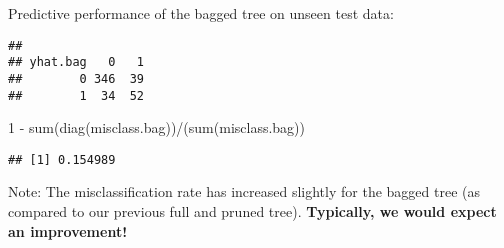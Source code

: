 \documentclass[
  10pt,
  ignorenonframetext,
]{beamer}
\newenvironment{Shaded}{\begin{snugshade}}{\end{snugshade}}
\newcommand{\AttributeTok}[1]{\textcolor[rgb]{0.77,0.63,0.00}{#1}}
\newcommand{\DecValTok}[1]{\textcolor[rgb]{0.00,0.00,0.81}{#1}}
\newcommand{\FunctionTok}[1]{\textcolor[rgb]{0.00,0.00,0.00}{#1}}
\newcommand{\NormalTok}[1]{#1}
\newcommand{\OtherTok}[1]{\textcolor[rgb]{0.56,0.35,0.01}{#1}}
\newcommand{\SpecialCharTok}[1]{\textcolor[rgb]{0.00,0.00,0.00}{#1}}
\begin{document}
\begin{frame}[fragile]
Predictive performance of the bagged tree on unseen test data:

\vspace{2mm}

\scriptsize

\begin{Shaded}
\end{Shaded}

\begin{verbatim}
##         
## yhat.bag   0   1
##        0 346  39
##        1  34  52
\end{verbatim}

\begin{Shaded}
\begin{Highlighting}[]
\DecValTok{1} \SpecialCharTok{{-}} \FunctionTok{sum}\NormalTok{(}\FunctionTok{diag}\NormalTok{(misclass.bag))}\SpecialCharTok{/}\NormalTok{(}\FunctionTok{sum}\NormalTok{(misclass.bag))}
\end{Highlighting}
\end{Shaded}

\begin{verbatim}
## [1] 0.154989
\end{verbatim}

\normalsize

Note: The misclassification rate has increased slightly for the bagged
tree (as compared to our previous full and pruned tree).
\textbf{Typically, we would expect an improvement!}
\end{frame}
\end{document}

